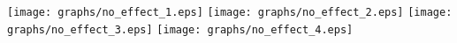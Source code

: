 \documentclass{article}
\begin{document}
\texttt{[image: graphs/no\_effect\_1.eps]} \pagebreak
\texttt{[image: graphs/no\_effect\_2.eps]} \pagebreak
\texttt{[image: graphs/no\_effect\_3.eps]} \pagebreak
\texttt{[image: graphs/no\_effect\_4.eps]} \pagebreak
\end{document}
